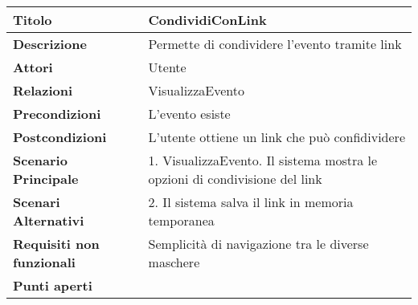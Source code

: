 \begin{tabular} {|P{4.5cm}|P{12.5cm}|}
  \hline
  \textbf{Titolo}                   & CondividiConLink                                  \\
  \hline
  \textbf{Descrizione}              & Permette di condividere l'evento tramite link     \\
  \hline
  \textbf{Attori}                   & Utente                                            \\
  \hline
  \textbf{Relazioni}                & VisualizzaEvento                                  \\
  \hline
  \textbf{Precondizioni}            & L'evento esiste                                   \\
  \hline
  \textbf{Postcondizioni}           & L'utente ottiene un link che può confidividere    \\
  \hline
  \textbf{Scenario Principale}      & 1. VisualizzaEvento. Il sistema mostra le opzioni di condivisione del link                              \\
  \hline
  \textbf{Scenari Alternativi}      & 2. Il sistema salva il link in memoria temporanea \\
  \hline
  \textbf{Requisiti non funzionali} & Semplicità di navigazione tra le diverse maschere \\
  \hline
  \textbf{Punti aperti}             &                                                   \\
  \hline
\end{tabular}
\hfill
\break

